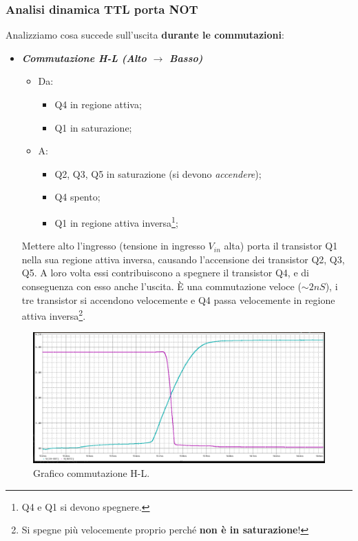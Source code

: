 \documentclass[
]{book}
\providecommand{\tightlist}{%
  \setlength{\itemsep}{0pt}\setlength{\parskip}{0pt}}
\begin{document}
\subsubsection{Analisi dinamica TTL porta
NOT}\label{analisi-dinamica-ttl-porta-not}

Analizziamo cosa succede sull'uscita \textbf{durante le commutazioni}:

\begin{itemize}
\tightlist
\item
  \textbf{\emph{Commutazione H-L (Alto \(\to\) Basso)}}

  \begin{itemize}
  \tightlist
  \item
    Da:

    \begin{itemize}
    \tightlist
    \item
      Q4 in regione attiva;
    \item
      Q1 in saturazione;
    \end{itemize}
  \item
    A:

    \begin{itemize}
    \tightlist
    \item
      Q2, Q3, Q5 in saturazione (si devono \emph{accendere});
    \item
      Q4 spento;
    \item
      Q1 in regione attiva inversa\footnote{Q4 e Q1 si devono spegnere.};
    \end{itemize}
  \end{itemize}

  Mettere alto l'ingresso (tensione in ingresso \(V_{in}\) alta) porta
  il transistor Q1 nella sua regione attiva inversa, causando
  l'accensione dei transistor Q2, Q3, Q5. A loro volta essi
  contribuiscono a spegnere il transistor Q4, e di conseguenza con esso
  anche l'uscita. È una commutazione veloce (\(\sim 2nS\)), i tre
  transistor si accendono velocemente e Q4 passa velocemente in regione
  attiva inversa\footnote{Si spegne più velocemente proprio perché
    \textbf{non è in saturazione}!}.
\end{itemize}

\begin{figure}
\centering
\includegraphics[width=0.6\linewidth,height=\textheight,keepaspectratio]{assets/imgs/grafico_commutazione_h_l.png}
\caption{Grafico commutazione H-L.}
\end{figure}
\end{document}
